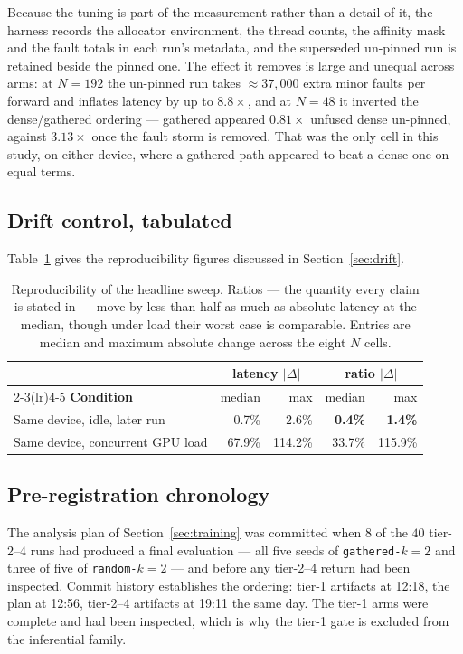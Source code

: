 Because the tuning is part of the measurement rather than a detail of it, the
harness records the allocator environment, the thread counts, the affinity mask
and the fault totals in each run's metadata, and the superseded un-pinned run
is retained beside the pinned one. The effect it removes is large and unequal
across arms: at $N{=}192$ the un-pinned run takes $\approx37{,}000$ extra minor
faults per forward and inflates latency by up to $8.8\times$, and at $N{=}48$
it inverted the dense/gathered ordering --- gathered appeared $0.81\times$
unfused dense un-pinned, against $3.13\times$ once the fault storm is removed.
That was the only cell in this study, on either device, where a gathered path
appeared to beat a dense one on equal terms.

\subsection{Drift control, tabulated}
\label{app:drift}

Table~\ref{tab:drift} gives the reproducibility figures discussed in
Section~\ref{sec:drift}.

\begin{table}[ht]
\centering
\small
\caption{Reproducibility of the headline sweep. Ratios --- the quantity every
claim is stated in --- move by less than half as much as absolute latency at
the median, though under load their worst case is comparable. Entries are
median and maximum absolute change across the eight $N$ cells.}
\label{tab:drift}
\begin{tabular}{lrrrr}
\toprule
& \multicolumn{2}{c}{\textbf{latency} $|\Delta|$} & \multicolumn{2}{c}{\textbf{ratio} $|\Delta|$} \\
\cmidrule(lr){2-3}\cmidrule(lr){4-5}
\textbf{Condition} & median & max & median & max \\
\midrule
Same device, idle, later run        & 0.7\%  & 2.6\%   & \textbf{0.4\%}  & \textbf{1.4\%} \\
Same device, concurrent GPU load    & 67.9\% & 114.2\% & 33.7\% & 115.9\% \\
\bottomrule
\end{tabular}
\end{table}

\subsection{Pre-registration chronology}
\label{app:prereg}

The analysis plan of Section~\ref{sec:training} was committed when $8$ of the
$40$ tier-2--4 runs had produced a final evaluation --- all five seeds of
\texttt{gathered-}$k{=}2$ and three of five of \texttt{random-}$k{=}2$ --- and
before any tier-2--4 return had been inspected. Commit history establishes the
ordering: tier-1 artifacts at 12:18, the plan at 12:56, tier-2--4 artifacts at
19:11 the same day. The tier-1 arms were complete and had been inspected, which
is why the tier-1 gate is excluded from the inferential family.

